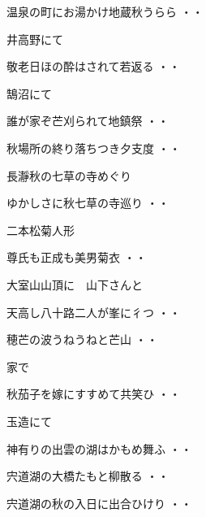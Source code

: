 \begin{shiika}温泉の町にお湯かけ地蔵秋うらら
\hfill{・・}\end{shiika}
\vspace{0.6cm}
井高野にて
\begin{shiika}敬老日ほの酔はされて若返る
\hfill{・・}\end{shiika}
\vspace{0.6cm}
鵠沼にて
\begin{shiika}誰が家ぞ芒刈られて地鎮祭
\hfill{・・}\end{shiika}
\begin{shiika}秋場所の終り落ちつき夕支度
\hfill{・・}\end{shiika}
\vspace{0.6cm}
長瀞秋の七草の寺めぐり
\begin{shiika}ゆかしさに秋七草の寺巡り
\hfill{・・}\end{shiika}
\vspace{0.6cm}
二本松菊人形		
\begin{shiika}尊氏も正成も美男菊衣
\hfill{・・}\end{shiika}
\vspace{0.6cm}
大室山山頂に　山下さんと
\begin{shiika}天高し八十路二人が峯に彳つ
\hfill{・・}\end{shiika}
\begin{shiika}穂芒の波うねうねと芒山
\hfill{・・}\end{shiika}
\vspace{0.6cm}
家で
\begin{shiika}秋茄子を嫁にすすめて共笑ひ
\hfill{・・}\end{shiika}
\vspace{0.6cm}
玉造にて
\begin{shiika}神有りの出雲の湖はかもめ舞ふ
\hfill{・・}\end{shiika}
\begin{shiika}宍道湖の大橋たもと柳散る
\hfill{・・}\end{shiika}
\begin{shiika}宍道湖の秋の入日に出合ひけり
\hfill{・・}\end{shiika}
